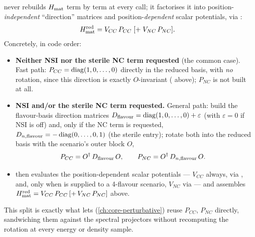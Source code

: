 \begin{implbox}[title={Explicit construction of \texorpdfstring{$H_{\rm mat}$}{H\_mat} under BSM extensions}]
 never rebuilds $H_{\rm mat}$ term by
term at every call; it factorises it into position-\emph{independent}
``direction'' matrices and position-\emph{dependent} scalar potentials, via
:
\begin{equation}
  H_{\rm mat}^{\rm red} = V_{CC}\,P_{CC} \; [+\; V_{NC}\,P_{NC}].
\end{equation}
Concretely, in code order:
\begin{itemize}
  \item \textbf{Neither NSI nor the sterile NC term requested} (the common
    case). Fast path: $P_{CC}=\operatorname{diag}(1,0,\dots,0)$ directly in the reduced
    basis, with \emph{no} rotation, since this direction is exactly
    $O$-invariant ( above); $P_{NC}$ is not
    built at all.
  \item \textbf{NSI and/or the sterile NC term requested.} General path:
    build the flavour-basis direction matrices
    $D_{\rm flavour}=\operatorname{diag}(1,0,\dots,0)+\varepsilon$ (with $\varepsilon=0$
    if NSI is off) and, only if the NC term is requested,
    $D_{n,\rm flavour}=-\operatorname{diag}(0,\dots,0,1)$ (the sterile entry); rotate both
    into the reduced basis with the scenario's outer block $O$,
    \begin{equation}
      P_{CC} = O^\dagger\,D_{\rm flavour}\,O,
      \qquad
      P_{NC} = O^\dagger\,D_{n,\rm flavour}\,O.
    \end{equation}
  \item {} then evaluates the
    position-dependent scalar potentials --- $V_{CC}$ always, via
    , and, only when  is
    supplied to a 4-flavour scenario, $V_{NC}$ via
     --- and assembles
    $H_{\rm mat}^{\rm red}=V_{CC}\,P_{CC}\,[+\,V_{NC}\,P_{NC}]$ above.
\end{itemize}
This split is exactly what lets 
(\cref{ch:core-perturbative}) reuse $P_{CC}$, $P_{NC}$ directly, sandwiching
them against the spectral projectors without recomputing the rotation at
every energy or density sample.
\end{implbox}


